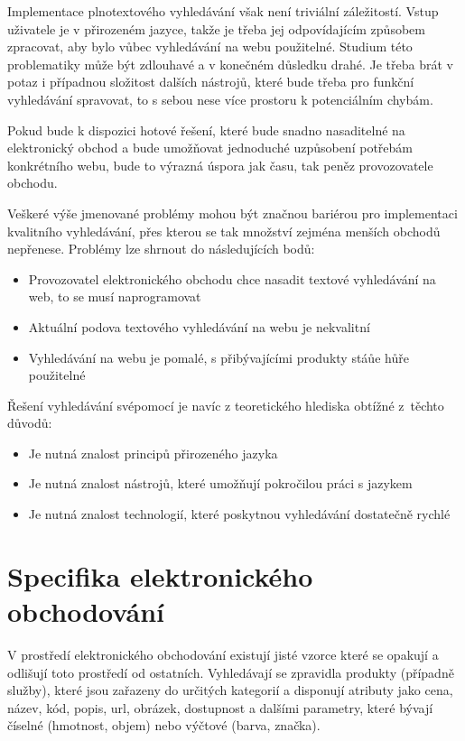 \documentclass[FM,DP]{tulthesis}
\begin{document}
Implementace plnotextového vyhledávání však není triviální záležitostí. Vstup uživatele
je v přirozeném jazyce, takže je třeba jej odpovídajícím způsobem zpracovat, 
aby bylo vůbec vyhledávání na webu použitelné. Studium této problematiky
může být zdlouhavé a v konečném důsledku drahé. Je třeba brát v potaz
i případnou složitost dalších nástrojů, které bude třeba pro funkční vyhledávání spravovat, 
to s sebou nese více prostoru k potenciálním chybám.

Pokud bude k dispozici hotové řešení, které bude snadno nasaditelné na elektronický obchod 
a bude umožňovat jednoduché uzpůsobení potřebám konkrétního webu, bude to výrazná úspora jak 
času, tak peněz provozovatele obchodu.

Veškeré výše jmenované problémy mohou být značnou bariérou pro implementaci kvalitního vyhledávání, 
přes kterou se tak množství zejména menších obchodů nepřenese. Problémy lze shrnout do následujících bodů:

\begin{itemize}
\item Provozovatel elektronického obchodu chce nasadit textové vyhledávání na web, to se musí naprogramovat
\item Aktuální podova textového vyhledávání na webu je nekvalitní
\item Vyhledávání na webu je pomalé, s přibývajícími produkty stáůe hůře použitelné
\end{itemize}

Řešení vyhledávání svépomocí je navíc z teoretického hlediska obtížné z~těchto důvodů:

\begin{itemize}
\item Je nutná znalost principů přirozeného jazyka
\item Je nutná znalost nástrojů, které umožňují pokročilou práci s jazykem
\item Je nutná znalost technologií, které poskytnou vyhledávání dostatečně rychlé
\end{itemize}

\section{Specifika elektronického obchodování}

V prostředí elektronického obchodování existují jisté vzorce které se opakují a odlišují
toto prostředí od ostatních. Vyhledávají se zpravidla produkty (případně služby), které jsou
zařazeny do určitých kategorií a disponují atributy jako cena, název, kód, popis, url, obrázek, 
dostupnost a dalšími parametry, které bývají číselné (hmotnost, objem) nebo výčtové (barva, značka). 
\end{document}
